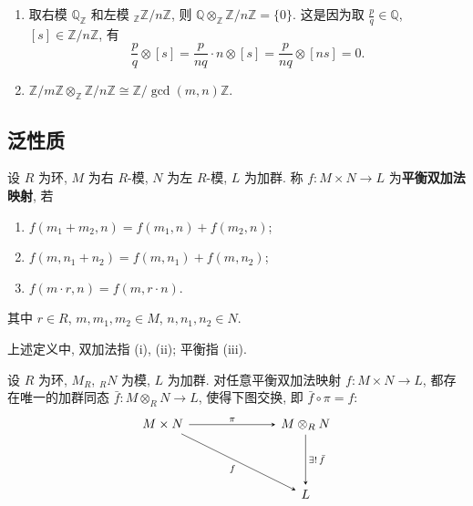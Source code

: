 \begin{example}
\begin{enumerate}
\item 取右模 $\mathbb{Q}_{\mathbb{Z}}$ 和左模 ${}_{\mathbb{Z}}\mathbb{Z}/n\mathbb{Z}$, 则 $\mathbb{Q}\otimes_{\mathbb{Z}}\mathbb{Z}/n\mathbb{Z}=\{0\}$.
这是因为取 $\frac{p}{q}\in\mathbb{Q}$, $[s]\in\mathbb{Z}/n\mathbb{Z}$, 有
\[
  \frac{p}{q}\otimes[s]=\frac{p}{nq}\cdot n\otimes[s]=\frac{p}{nq}\otimes[ns]=0 .
\]

\item $\mathbb{Z}/m\mathbb{Z}\otimes_{\mathbb{Z}}\mathbb{Z}/n\mathbb{Z}\cong\mathbb{Z}/\gcd(m,n)\mathbb{Z}$.
\end{enumerate}
\end{example}

\subsection{泛性质}

\begin{definition}[平衡双加法映射]\label{def:balanced}
设 $R$ 为环, $M$ 为右 $R$-模, $N$ 为左 $R$-模, $L$ 为加群.
称 $f\colon M\times N\to L$ 为\textbf{平衡双加法映射}, 若
\begin{enumerate}[label=(\arabic*)]
  \item $f(m_1+m_2,n)=f(m_1,n)+f(m_2,n)$;
  \item $f(m,n_1+n_2)=f(m,n_1)+f(m,n_2)$;
  \item $f(m\cdot r,n)=f(m,r\cdot n)$.
\end{enumerate}
其中 $r\in R$, $m,m_1,m_2\in M$, $n,n_1,n_2\in N$.
\end{definition}

\begin{remark}\label{rem:balanced}
上述定义中, 双加法指 (i), (ii); 平衡指 (iii).
\end{remark}

\begin{theorem}[张量积的泛性质]\label{thm:tensor-universal}
设 $R$ 为环, $M_R$, ${}_R N$ 为模, $L$ 为加群.
对任意平衡双加法映射 $f\colon M\times N\to L$, 都存在唯一的加群同态 $\bar f\colon M\otimes_R N\to L$,
使得下图交换, 即 $\bar f\circ\pi=f$:
\[
  \begin{tikzcd}[row sep=1.4cm, column sep=2.4cm, arrows={->,>=stealth}]
    M\times N \arrow[r,"\pi"] \arrow[dr,"f"'] & M\otimes_R N \arrow[d,"\exists!\,\bar f"] \\
    & L
  \end{tikzcd}
\]
\end{theorem}

